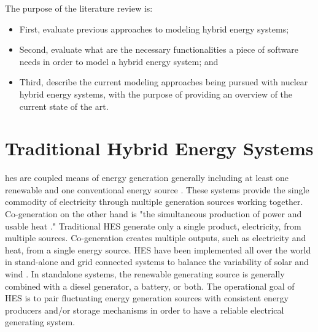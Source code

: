 The purpose of the literature review is:
\begin{itemize}
\item First, evaluate previous approaches to modeling hybrid energy systems;
\item Second, evaluate what are the necessary functionalities a piece of software needs in order to model a hybrid energy system; and
\item Third, describe the current modeling approaches being pursued with nuclear hybrid energy systems, with the purpose of providing an overview of the current state of the art.
\end{itemize}


\section{Traditional Hybrid Energy Systems}
\ac{hes} are coupled means of energy generation generally including at least one renewable and one conventional energy source \cite {Ibrahim2011}. These systems provide the single commodity of electricity through multiple generation sources working together. Co-generation on the other hand is "the simultaneous production of power and usable heat \cite{Rosen2005}." Traditional HES generate only a single product, electricity, from multiple sources. Co-generation creates multiple outputs, such as electricity and heat, from a single energy source. HES have been implemented all over the world in stand-alone and grid connected systems to balance the variability of solar and wind \cite {Garcia2015, Qi2014, Shin2015, Nixon2012, Adaramola2014, Goodbody2013, BorgesNeto2010, McGowan1996}. In standalone systems, the renewable generating source is generally combined with a diesel generator, a battery, or both. The operational goal of HES is to pair fluctuating energy generation sources with consistent energy producers and/or storage mechanisms in order to have a reliable electrical generating system.

